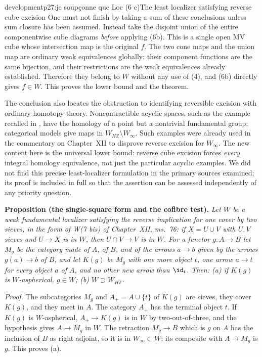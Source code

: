 \begin{dcomment}{development}{p27:je soupçonne que Loc (6 c)}{The least localizer satisfying reverse cube excision}
One must not finish by taking a sum of these conclusions unless sum closure has been assumed. Instead take the disjoint union of the entire componentwise cube diagrams \emph{before} applying (6b). This is a single open MV cube whose intersection map is the original $f$. The two cone maps and the union map are ordinary weak equivalences globally: their component functions are the same bijection, and their restrictions are the weak equivalences already established. Therefore they belong to $W$ without any use of (4), and (6b) directly gives $f\in W$. This proves the lower bound and the theorem.

The conclusion also locates the obstruction to identifying reversible excision with ordinary homotopy theory. Noncontractible acyclic spaces, such as the example recalled in \citet[discussion following Corollary 4.33, p.~368]{Hatcher2002}, have the homology of a point but a nontrivial fundamental group; categorical models give maps in $W_{H\mathbb Z}\setminus W_\infty$. Such examples were already used in the commentary on Chapter~XII to disprove reverse excision for $W_\infty$. The new content here is the universal lower bound: reverse cube excision forces \emph{every} integral homology equivalence, not just the particular acyclic examples. We did not find this precise least-localizer formulation in the primary sources examined; its proof is included in full so that the assertion can be assessed independently of any priority question.

\textbf{Proposition (the single-square form and the cofibre test).}\ours
\textit{Let $W$ be a weak fundamental localizer satisfying the reverse implication for one cover by two sieves, in the form of W(7 bis) of Chapter~XII, ms.~76: if $X=U\cup V$ with $U,V$ sieves and $U\to X$ is in $W$, then $U\cap V\to V$ is in $W$. For a functor $g:A\to B$ let $M_g$ be the category made of $A$, of $B$, and of the arrows $a\to b$ given by the arrows $g(a)\to b$ of $B$, and let $K(g)$ be $M_g$ with one more object $t$, one arrow $a\to t$ for every object $a$ of $A$, and no other new arrow than $\id_t$. Then: (a) if $K(g)$ is $W$-aspherical, $g\in W$; (b) $W\supset W_{H\mathbb Z}$.}

\textit{Proof.}
The subcategories $M_g$ and $A_+=A\cup\{t\}$ of $K(g)$ are sieves, they cover $K(g)$, and they meet in $A$. The category $A_+$ has the terminal object $t$. If $K(g)$ is $W$-aspherical, $A_+\to K(g)$ is in $W$ by two-out-of-three, and the hypothesis gives $A\to M_g$ in $W$. The retraction $M_g\to B$ which is $g$ on $A$ has the inclusion of $B$ as right adjoint, so it is in $W_\infty\subset W$; its composite with $A\to M_g$ is $g$. This proves (a).


\end{dcomment}
